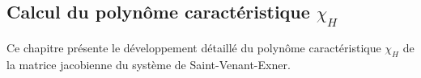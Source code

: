 \documentclass[11pt, a4paper, oneside]{report}
\begin{document}
\begin{appendices}

\renewcommand{\appendixtocname}{Annexes}
\renewcommand{\chaptername}{Annexe}


\chapter{Calcul du polynôme caractéristique \texorpdfstring{$\chi_H$}{chi_H}}
\label{annexe:polynome_caracteristique}

Ce chapitre présente le développement détaillé du polynôme caractéristique $\chi_H$ de la matrice jacobienne du système de Saint-Venant-Exner.

\allowdisplaybreaks


\end{appendices}
\end{document}
